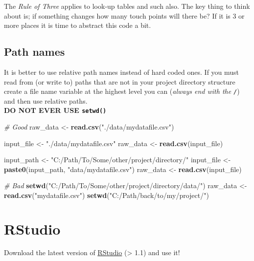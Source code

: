 \documentclass[]{book}
\newenvironment{Shaded}{\begin{snugshade}}{\end{snugshade}}
\newcommand{\CommentTok}[1]{\textcolor[rgb]{0.56,0.35,0.01}{\textit{#1}}}
\newcommand{\KeywordTok}[1]{\textcolor[rgb]{0.13,0.29,0.53}{\textbf{#1}}}
\newcommand{\NormalTok}[1]{#1}
\newcommand{\StringTok}[1]{\textcolor[rgb]{0.31,0.60,0.02}{#1}}
\theoremstyle{definition}
\theoremstyle{definition}
\theoremstyle{definition}
\theoremstyle{remark}
\begin{document}
The \emph{Rule of Three} applies to look-up tables and such also. The
key thing to think about is; if something changes how many touch points
will there be? If it is 3 or more places it is time to abstract this
code a bit.

\hypertarget{path-names}{%
\subsection{Path names}\label{path-names}}

It is better to use relative path names instead of hard coded ones. If
you must read from (or write to) paths that are not in your project
directory structure create a file name variable at the highest level you
can (\emph{always end with the \texttt{/}}) and then use relative
paths.\\
\textbf{DO NOT EVER USE \texttt{setwd()}}

\begin{Shaded}
\begin{Highlighting}[]
\CommentTok{# Good}
\NormalTok{raw_data <-}\StringTok{ }\KeywordTok{read.csv}\NormalTok{(}\StringTok{"./data/mydatafile.csv"}\NormalTok{) }

\NormalTok{input_file <-}\StringTok{ "./data/mydatafile.csv"}
\NormalTok{raw_data <-}\StringTok{ }\KeywordTok{read.csv}\NormalTok{(input_file)  }

\NormalTok{input_path <-}\StringTok{ "C:/Path/To/Some/other/project/directory/"}
\NormalTok{input_file <-}\StringTok{ }\KeywordTok{paste0}\NormalTok{(input_path, }\StringTok{"data/mydatafile.csv"}\NormalTok{)}
\NormalTok{raw_data <-}\StringTok{ }\KeywordTok{read.csv}\NormalTok{(input_file)}

\CommentTok{# Bad}
\KeywordTok{setwd}\NormalTok{(}\StringTok{"C:/Path/To/Some/other/project/directory/data/"}\NormalTok{)}
\NormalTok{raw_data <-}\StringTok{ }\KeywordTok{read.csv}\NormalTok{(}\StringTok{"mydatafile.csv"}\NormalTok{)}
\KeywordTok{setwd}\NormalTok{(}\StringTok{"C:/Path/back/to/my/project/"}\NormalTok{)}
\end{Highlighting}
\end{Shaded}

\hypertarget{rstudio}{%
\section{RStudio}\label{rstudio}}

Download the latest version of
\href{https://www.rstudio.com/products/rstudio/download/\#download}{RStudio}
(\textgreater{} 1.1) and use it!
\end{document}

